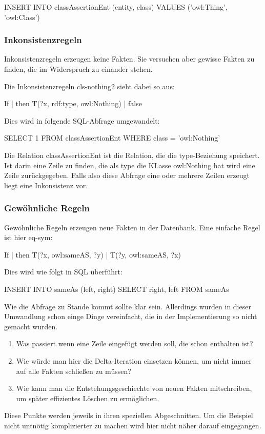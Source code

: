 INSERT INTO classAssertionEnt (entity, class)
	VALUES ('owl:Thing', 'owl:Class')

\subsubsection{Inkonsistenzregeln}
Inkonsistenzregeln erzeugen keine Fakten. Sie versuchen aber gewisse Fakten zu finden, die im Widerspruch zu einander stehen.

Die Inkonsistenzregeln cls-nothing2 sieht dabei so aus:

If | then
T(?x, rdf:type, owl:Nothing) | false

Dies wird in folgende SQL-Abfrage umgewandelt:

SELECT 1
FROM classAssertionEnt
WHERE class = 'owl:Nothing'

Die Relation classAssertionEnt ist die Relation, die die type-Beziehung speichert. Ist darin eine Zeile zu finden, die als type die KLasse owl:Nothing hat wird eine Zeile zurückgegeben. Falls also diese Abfrage eine oder mehrere Zeilen erzeugt liegt eine Inkonsistenz vor.

\subsubsection{Gewöhnliche Regeln}
Gewöhnliche Regeln erzeugen neue Fakten in der Datenbank. Eine einfache Regel ist hier eq-sym:

If | then
T(?x, owl:sameAS, ?y) | T(?y, owl:sameAS, ?x)

Dies wird wie folgt in SQL überführt:

INSERT INTO sameAs (left, right)
SELECT right, left
FROM sameAs

Wie die Abfrage zu Stande kommt sollte klar sein. Allerdings wurden in dieser Umwandlung schon einge Dinge vereinfacht, die in der Implementierung so nicht gemacht wurden.

\begin{enumerate}
  \item Was passiert wenn eine Zeile eingefügt werden soll, die schon enthalten ist?
  \item Wie würde man hier die Delta-Iteration einsetzen können, um nicht immer auf alle Fakten schließen zu müssen?
  \item Wie kann man die Entstehungsgeschiechte von neuen Fakten mitschreiben, um später effizientes Löschen zu ermöglichen.
\end{enumerate}

Diese Punkte werden jeweils in ihren speziellen Abgeschnitten. Um die Beispiel nicht untnötig komplizierter zu machen wird hier nicht näher darauf eingegangen.

